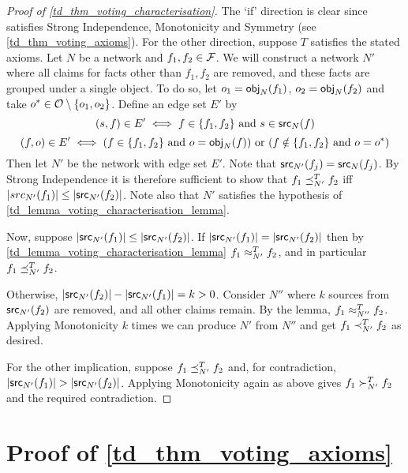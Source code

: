 \begin{proof}[Proof of \cref{td_thm_voting_characterisation}]

The `if' direction is clear since \voting{} satisfies Strong Independence,
Monotonicity and Symmetry (see \cref{td_thm_voting_axioms}). For the other
direction, suppose $T$ satisfies the stated axioms. Let $N$ be a network and
$f_1, f_2 \in \mathcal{F}$. We will construct a network $N'$ where all claims for facts
other than $f_1, f_2$ are removed, and these facts are grouped under a single
object. To do so, let $o_1 = \mathsf{obj}_N(f_1)$, $o_2 = \mathsf{obj}_N(f_2)$ and take $o^*
\in \mathcal{O} \setminus \{o_1, o_2\}$.  Define an edge set $E'$ by
\[
    (s, f) \in E' \iff f \in \{f_1, f_2\} \text{ and } s \in \mathsf{src}_N(f)
\]
\[
    (f, o) \in E'
    \iff
        (f \in \{f_1, f_2\} \text{ and } o = \mathsf{obj}_N(f))
        \text{ or }
        (f \notin \{f_1, f_2\} \text{ and } o = o^*)
\]
Then let $N'$ be the network with edge set $E'$. Note that $\mathsf{src}_{N'}(f_j) =
\mathsf{src}_N(f_j)$. By Strong Independence it is therefore sufficient to show that
$f_1 \preceq_{N'}^T f_2$ iff $|src_{N'}(f_1)| \le |\mathsf{src}_{N'}(f_2)|$. Note also
that $N'$ satisfies the hypothesis of \cref{td_lemma_voting_characterisation_lemma}.

Now, suppose $|\mathsf{src}_{N'}(f_1)| \le |\mathsf{src}_{N'}(f_2)|$. If $|\mathsf{src}_{N'}(f_1)| =
|\mathsf{src}_{N'}(f_2)|$ then by \cref{td_lemma_voting_characterisation_lemma} $f_1
\approx_{N'}^T f_2$, and in particular $f_1 \preceq_{N'}^T f_2$.

Otherwise, $|\mathsf{src}_{N'}(f_2)| - |\mathsf{src}_{N'}(f_1)| = k > 0$. Consider $N''$ where
$k$ sources from $\mathsf{src}_{N'}(f_2)$ are removed, and all other claims remain. By
the lemma, $f_1 \approx_{N''}^T f_2$. Applying Monotonicity $k$ times we can
produce $N'$ from $N''$ and get $f_1 \prec_{N'}^T f_2$ as desired.

For the other implication, suppose $f_1 \preceq_{N'}^T f_2$ and, for
contradiction, $|\mathsf{src}_{N'}(f_1)| > |\mathsf{src}_{N'}(f_2)|$. Applying Monotonicity
again as above gives $f_1 \succ_{N'}^T f_2$ and the required contradiction.
\end{proof}

\section{Proof of \cref{td_thm_voting_axioms}}

